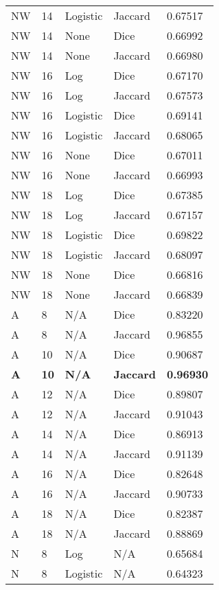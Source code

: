 \documentclass{article}
\begin{document}
\begin{center}
\begin{supertabular}{| l | l | l | l | l |}
               NW & 14 & Logistic & Jaccard & 0.67517 \\
               NW & 14 & None & Dice & 0.66992 \\
               NW & 14 & None & Jaccard & 0.66980 \\
               NW & 16 & Log & Dice & 0.67170 \\
               NW & 16 & Log & Jaccard & 0.67573 \\
               NW & 16 & Logistic & Dice & 0.69141 \\
               NW & 16 & Logistic & Jaccard & 0.68065 \\
               NW & 16 & None & Dice & 0.67011 \\
               NW & 16 & None & Jaccard & 0.66993 \\
               NW & 18 & Log & Dice & 0.67385 \\
               NW & 18 & Log & Jaccard & 0.67157 \\
               NW & 18 & Logistic & Dice & 0.69822 \\
               NW & 18 & Logistic & Jaccard & 0.68097 \\
               NW & 18 & None & Dice & 0.66816 \\
               NW & 18 & None & Jaccard & 0.66839 \\
               A & 8 & N/A & Dice & 0.83220 \\
               A & 8 & N/A & Jaccard & 0.96855 \\
               A & 10 & N/A & Dice & 0.90687 \\
               \textbf{A} & \textbf{10} & \textbf{N/A} & \textbf{Jaccard} & \textbf{0.96930} \\
               A & 12 & N/A & Dice & 0.89807 \\
               A & 12 & N/A & Jaccard & 0.91043 \\
               A & 14 & N/A & Dice & 0.86913 \\
               A & 14 & N/A & Jaccard & 0.91139 \\
               A & 16 & N/A & Dice & 0.82648 \\
               A & 16 & N/A & Jaccard & 0.90733 \\
               A & 18 & N/A & Dice & 0.82387 \\
               A & 18 & N/A & Jaccard & 0.88869 \\
               N & 8 & Log & N/A & 0.65684 \\
               N & 8 & Logistic & N/A & 0.64323 \\

\end{supertabular}
\end{center}
\end{document}
